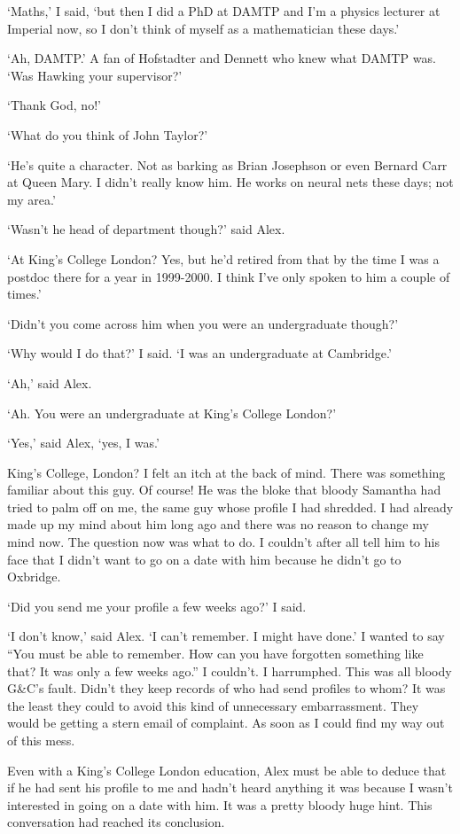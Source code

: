 `Maths,' I said, `but then I did a PhD at DAMTP and I'm a physics
lecturer at Imperial now, so I don't think of myself as a
mathematician these days.'

`Ah, DAMTP.' A fan of Hofstadter and Dennett who knew what DAMTP
was. `Was Hawking your supervisor?'

`Thank God, no!'

`What do you think of John Taylor?'

`He's quite a character. Not as barking as Brian Josephson or even Bernard Carr at
Queen Mary. I didn't really know him. He works on neural nets these days; not my area.'

`Wasn't he head of department though?' said Alex.

`At King's College London? Yes, but he'd retired from that by the time I was a postdoc there for a year in 1999-2000. I think I've only spoken to him a couple of times.'

`Didn't you come across him when you were an undergraduate though?'

`Why would I do that?' I said. `I was an undergraduate at
Cambridge.'

`Ah,' said Alex.

`Ah. You were an undergraduate at King's College London?'

`Yes,' said Alex, `yes, I was.'

King's College, London? I felt an itch at the back of mind. There
was something familiar about this guy. Of course! He was the bloke
that bloody Samantha had tried to palm off on me, the same guy whose
profile I had shredded. I had already made up my mind about him long
ago and there was no reason to change my mind now. The question now
was what to do. I couldn't after all tell him to his face that I didn't want
to go on a date with him because he didn't go to Oxbridge.

`Did you send me your profile a few weeks ago?' I said.

`I don't know,' said Alex. `I can't remember. I might have done.' I
wanted to say ``You must be able to remember. How can you have
forgotten something like that? It was only a few weeks ago.'' I
couldn't. I harrumphed. This was all bloody G{\&}C's fault. Didn't
they keep records of who had send profiles to whom? It was the least
they could to avoid this kind of unnecessary embarrassment. They
would be getting a stern email of complaint. As soon as I could find my
way out of this mess.

Even with a King's College London education, Alex must be able to
deduce that if he had sent his profile to me and hadn't heard
anything it was because I wasn't interested in going on a date with
him. It was a pretty bloody huge hint. This conversation had reached
its conclusion.

